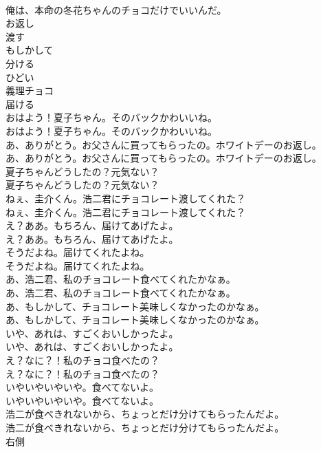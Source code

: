 \documentclass[8pt]{extreport}
\begin{document}
\begin{CJK}{UTF8}{min}
\\	俺は、本命の冬花ちゃんのチョコだけでいいんだ。 
\\	お返し
\\	渡す
\\	もしかして
\\	分ける
\\	ひどい
\\	義理チョコ
\\	届ける
\\	おはよう！夏子ちゃん。そのバックかわいいね。	
\\	おはよう！夏子ちゃん。そのバックかわいいね。 
\\	あ、ありがとう。お父さんに買ってもらったの。ホワイトデーのお返し。	
\\	あ、ありがとう。お父さんに買ってもらったの。ホワイトデーのお返し。 
\\	夏子ちゃんどうしたの？元気ない？	
\\	夏子ちゃんどうしたの？元気ない？ 
\\	ねぇ、圭介くん。浩二君にチョコレート渡してくれた？	
\\	ねぇ、圭介くん。浩二君にチョコレート渡してくれた？ 
\\	え？ああ。もちろん、届けてあげたよ。	
\\	え？ああ。もちろん、届けてあげたよ。 
\\	そうだよね。届けてくれたよね。	
\\	そうだよね。届けてくれたよね。 
\\	あ、浩二君、私のチョコレート食べてくれたかなぁ。	
\\	あ、浩二君、私のチョコレート食べてくれたかなぁ。 
\\	あ、もしかして、チョコレート美味しくなかったのかなぁ。	
\\	あ、もしかして、チョコレート美味しくなかったのかなぁ。 
\\	いや、あれは、すごくおいしかったよ。	
\\	いや、あれは、すごくおいしかったよ。 
\\	え？なに？！私のチョコ食べたの？	
\\	え？なに？！私のチョコ食べたの？ 
\\	いやいやいやいや。食べてないよ。	
\\	いやいやいやいや。食べてないよ。 
\\	浩二が食べきれないから、ちょっとだけ分けてもらったんだよ。	
\\	浩二が食べきれないから、ちょっとだけ分けてもらったんだよ。 
\\	右側

\end{CJK}
\end{document}
